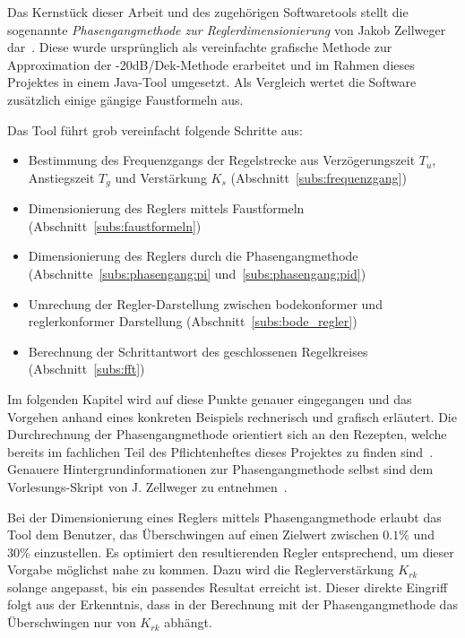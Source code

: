 Das  Kernst\"uck  dieser Arbeit  und  des  zugeh\"origen Softwaretools  stellt
die   sogenannte   \emph{Phasengangmethode  zur   Reglerdimensionierung}   von
Jakob   Zellweger   dar~\cite{regelungstechnik:zellweger_short}. Diese   wurde
urspr\"unglich  als  vereinfachte  grafische  Methode  zur  Approximation  der
-20dB/Dek-Methode erarbeitet und im Rahmen dieses Projektes in einem Java-Tool
umgesetzt. Als  Vergleich wertet  die Software  zus\"atzlich einige  g\"angige
Faustformeln aus.

Das Tool f\"uhrt grob vereinfacht folgende Schritte aus:
\begin{itemize}
    \item
        Bestimmung des  Frequenzgangs der Regelstrecke  aus Verz\"ogerungszeit
        $T_u$,     Anstiegszeit     $T_g$      und     Verst\"arkung     $K_s$
        (Abschnitt~\ref{subs:frequenzgang})
    \item
        Dimensionierung       des      Reglers       mittels      Faustformeln
        (Abschnitt~\ref{subs:faustformeln})
    \item
        Dimensionierung    des    Reglers    durch    die    Phasengangmethode
        (Abschnitte~\ref{subs:phasengang:pi} und~\ref{subs:phasengang:pid})
    \item
        Umrechung   der   Regler-Darstellung    zwischen   bodekonformer   und
        reglerkonformer Darstellung (Abschnitt~\ref{subs:bode_regler})
    \item
        Berechnung   der   Schrittantwort   des   geschlossenen   Regelkreises
        (Abschnitt~\ref{subs:fft})
\end{itemize}

Im   folgenden   Kapitel   wird   auf   diese   Punkte   genauer   eingegangen
und   das    Vorgehen   anhand    eines   konkreten    Beispiels   rechnerisch
und    grafisch   erl\"autert. Die    Durchrechnung   der    Phasengangmethode
orientiert     sich     an     den     Rezepten,     welche     bereits     im
fachlichen     Teil     des     Pflichtenheftes    dieses     Projektes     zu
finden  sind~\cite{ref:pflichtenheft}. Genauere  Hintergrundinformationen  zur
Phasengangmethode  selbst  sind  dem  Vorlesungs-Skript  von  J. Zellweger  zu
entnehmen~\cite{regelungstechnik:zellweger_short}.

Bei der  Dimensionierung eines  Reglers mittels Phasengangmethode  erlaubt das
Tool dem Benutzer, das \"Uberschwingen auf einen Zielwert zwischen $0.1\%$ und
$30\%$ einzustellen. Es  optimiert den resultierenden Regler  entsprechend, um
dieser Vorgabe  m\"oglichst nahe zu kommen. Dazu  wird die Reglerverst\"arkung
$K_{rk}$ solange  angepasst, bis  ein passendes Resultat  erreicht ist. Dieser
direkte Eingriff  folgt aus  der Erkenntnis,  dass in  der Berechnung  mit der
Phasengangmethode das \"Uberschwingen nur von $K_{rk}$ abh\"angt.

